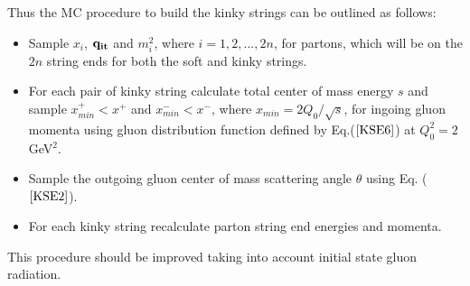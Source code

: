 Thus the MC procedure to build the kinky strings can be outlined as 
follows:
%
\begin{itemize}

\item Sample $x_i$, ${\bf q_{it}}$ and $m^2_i$, where $i = 1,2,...,2n$,
 for partons, which will be on the $2n$ string ends for both the soft
 and kinky strings.

\item For each pair of kinky string calculate total center of mass energy 
$s$ and sample $x^{+}_{min} < x^{+}$ and $x^{-}_{min} < x^{-}$, where 
$x_{min} = 2Q_{0}/\sqrt{s}$,  
for ingoing gluon momenta
using gluon distribution function defined by Eq.($\ref{KSE6}$) at
$Q^2_0 = 2$ GeV$^2$.

\item Sample the outgoing gluon center of mass scattering angle $\theta$ 
using Eq. ($\ref{KSE2}$).

\item For each kinky string recalculate parton string end energies and
momenta.

\end{itemize}
This procedure should be improved taking into account initial state 
gluon radiation.
